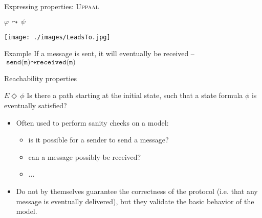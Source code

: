 \documentclass{beamer}
\def\dgold#1{{\darkgoldenrod #1}}
\def\dkb#1{{\blue #1}}
\begin{document}
\begin{slide}{Expressing properties: \textsc{Uppaal}}
\small

\begin{block}{$\varphi\, \leadsto\, \psi$}
\begin{center}
 \texttt{[image: ./images/LeadsTo.jpg]} 
 \end{center}
\end{block}

\begin{exampleblock}{Example}
  If a message is sent, it will eventually be received -- $\texttt{send(m)} \leadsto \texttt{received(m)}$
\end{exampleblock}

\end{slide}

\begin{slide}{Reachability properties}
\small

\begin{block}{$E \Diamond\, \phi$}
\dkb{Is there a path starting at the initial state, such that a state formula $\phi$ is eventually satisfied?}

\begin{itemize}
\item  Often used to perform sanity checks  on a model:
\begin{itemize}
\item \dgold{is it possible for a sender to send a message?}
 \item \dgold{can a message possibly be received?}
 \item ...
 \end{itemize}
 \item  Do not by themselves guarantee the correctness of the protocol (i.e. \dgold{that any message is eventually delivered}), 
but they validate the basic behavior of the model.
 \end{itemize}
\end{block}

\end{slide}
\end{document}
